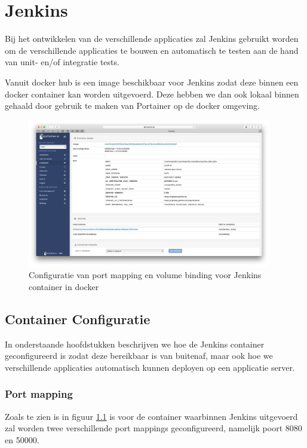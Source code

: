 \chapter{Jenkins}
Bij het ontwikkelen van de verschillende applicaties zal Jenkins gebruikt worden om de verschillende applicaties te bouwen en automatisch te testen aan de hand van unit- en/of integratie tests.

Vanuit docker hub is een image beschikbaar voor Jenkins zodat deze binnen een docker container kan worden uitgevoerd. Deze hebben we dan ook lokaal binnen gehaald door gebruik te maken van Portainer op de docker omgeving.

\begin{figure}[H]
	\centering
	\includegraphics[width=0.95\textwidth]{img/JenkinsContainerDetails.png}
	\caption{Configuratie van port mapping en volume binding voor Jenkins container in docker}
	\label{fig:JenkinsContainerDetails}
\end{figure}

\section{Container Configuratie}
In onderstaande hoofdstukken beschrijven we hoe de Jenkins container geconfigureerd is zodat deze bereikbaar is van buitenaf, maar ook hoe we verschillende applicaties automatisch kunnen deployen op een applicatie server.

\subsection{Port mapping}
Zoals te zien is in figuur \ref{fig:JenkinsContainerDetails} is voor de container waarbinnen Jenkins uitgevoerd zal worden twee verschillende port mappings geconfigureerd, namelijk poort 8080 en 50000.

